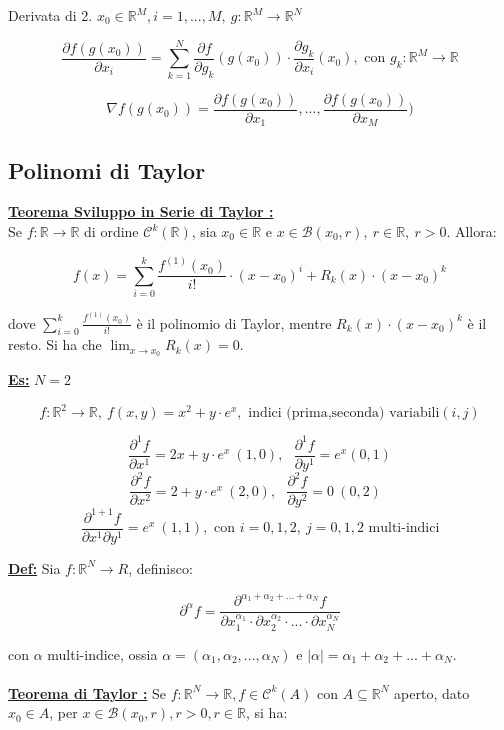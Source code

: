 \documentclass[a4paper,12pt]{article}
\newcommand{\definizione}{\noindent\textbf{\underline{Def:}} }
\newcommand{\esempio}{\noindent\textbf{\underline{Es:}} }
\newcommand{\teorema}[1]{\noindent\textbf{\underline{Teorema #1 :}} }
\begin{document}
	Derivata di 2. $ x_0 \in \mathbb{R}^M, i = 1, ..., M, \ g: \mathbb{R}^M \rightarrow \mathbb{R}^N$

	\[
	\frac{\partial f(g(x_0))}{\partial x_i} = \sum_{k = 1}^{N} \frac{\partial f}{\partial g_k} (g(x_0)) \cdot \frac{\partial g_k}{\partial x_i} (x_0), \text{ con } g_k : \mathbb{R}^M \rightarrow \mathbb{R}
	\]

	\[
	\nabla f(g(x_0)) = \frac{\partial f (g(x_0))}{\partial x_1}, ..., \frac{\partial f(g(x_0))}{\partial x_M})
	\]

	\subsection{Polinomi di Taylor}
	\label{subsec:taylor}

	\teorema{Sviluppo in Serie di Taylor} \\

	\noindent Se $f : \mathbb{R} \rightarrow \mathbb{R}$ di ordine $\mathcal{C}^k(\mathbb{R})$, sia $x_0 \in \mathbb{R}$ e $x \in \mathcal{B}(x_0, r),\  r \in \mathbb{R},\ r > 0$. Allora:

	\[
	f(x) = \sum_{ i = 0}^{k} \frac{f^{(1)} (x_0)}{i!} \cdot (x - x_0)^i + R_k(x) \cdot(x - x_0) ^k
	\]

	dove $\sum_{ i = 0}^{k} \frac{f^{(1)} (x_0)}{i!} $ è il polinomio di Taylor, mentre $R_k(x) \cdot(x - x_0) ^k$ è il resto. Si ha che $\lim_{x \rightarrow x_0} R_k(x) = 0$.

	\esempio $N = 2$

	\[
	f : \mathbb{R}^2 \rightarrow \mathbb{R}, \ f(x,y) = x^2 + y \cdot e^x, \text{ indici (prima,seconda) variabili} (i,j)
	\]

	\[
	\frac{\partial^1 f}{\partial x^1} = 2x + y \cdot e^x \ (1,0), \ \ \ \frac{\partial^1 f}{\partial y^1} = e^x (0,1)
	\]
	\[
	\frac{\partial^2 f}{\partial x^2} = 2 + y \cdot e^x \ (2,0), \ \ \
	\frac{\partial^2 f}{\partial y^2} = 0 \ (0,2) \ \ \
	\]
	\[
	\frac{\partial^{1+1} f}{\partial x^1 \partial y^1} = e^x \ (1,1), \text{ con } i = 0,1,2,\ j=0,1,2 \text{ multi-indici}
	\]

	\definizione Sia $f : \mathbb{R}^N \rightarrow R$, definisco:

	\[
	\partial^\alpha f = \frac{\partial^{\alpha_1 + \alpha_2 + ... + \alpha_N} f}{\partial x_1^{\alpha_1} \cdot \partial x_2^{\alpha_2} \cdot ... \cdot \partial x_N^{\alpha_N}}
	\]

	con $\alpha$ multi-indice, ossia $\alpha = (\alpha_1, \alpha_2, ..., \alpha_N)$ e $|\alpha| = \alpha_1 + \alpha_2 + ... + \alpha_N$. \\ \\
 	\teorema{ di Taylor}
 	Se $f : \mathbb{R}^N \rightarrow \mathbb{R}, f \in \mathcal{C}^k(A)$ con $A \subseteq \mathbb{R}^N$ aperto, dato $x_0 \in A$, per $ x \in \mathcal{B}(x_0,r), r > 0, r \in \mathbb{R}$, si ha:
\end{document}
